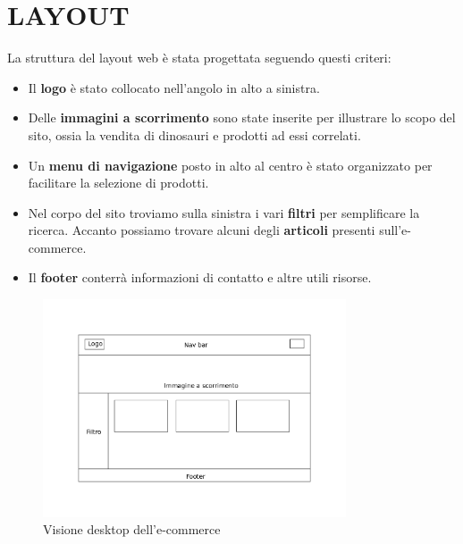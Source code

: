 \chapter{LAYOUT}
La struttura del layout web è stata progettata seguendo questi criteri:
\begin{itemize}
    \item Il \textbf{logo} è stato collocato nell'angolo in alto a sinistra.
    \item Delle \textbf{immagini a scorrimento} sono state inserite per illustrare lo scopo del sito, ossia la vendita di dinosauri e prodotti ad essi correlati.
    \item Un \textbf{menu di navigazione}  posto in alto al centro è stato organizzato per facilitare la selezione di prodotti.
    \item Nel corpo del sito troviamo sulla sinistra i vari \textbf{filtri} per semplificare la ricerca. Accanto possiamo trovare alcuni degli \textbf{articoli} presenti sull'e-commerce. 
    \item Il \textbf{footer} conterrà informazioni di contatto e altre utili risorse.
\end{itemize}
  \begin{figure}[H]
        \centering
        \includegraphics[width=0.80\textwidth]{immagini/desktop_view.png}
        \caption{Visione desktop dell'e-commerce}
    \end{figure}